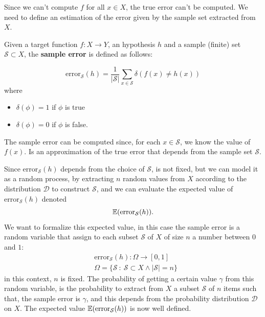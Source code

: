 \documentclass[10pt, letterpaper]{report}
\begin{document}
Since we can't compute $f$ for all $x\in X$, the true error can't be computed. We need to define an estimation of the error given by the sample set extracted from $X$.
\begin{definition}
	Given a target function $f:X\rightarrow Y$, an hypothesis $h$ and a sample (finite) set $\mathcal S\subset X$, the  \textbf{sample error} is defined as follows:
\end{definition}\begin{equation}
	\text{error}_{\mathcal S}(h)=
	\frac{1}{|\mathcal S|}\sum_{x\in\mathcal S}\delta(f(x)\ne h(x))
\end{equation}
where\begin{itemize}
	\item $\delta(\phi)=1$ if $\phi$ is true
	\item $\delta(\phi)=0$ if $\phi$ is false.
\end{itemize}
The sample error can be computed since, for each $x\in\mathcal S$, we know the value of $f(x)$. Is an approximation of the true error that depends from the sample set $\mathcal S$.\bigskip

Since $\text{error}_{\mathcal S}(h)$ depends from the choice of $\mathcal S$, is not fixed, but we can model it as a random process, by extracting $n$ random values from $X$ according to the distribution $\mathcal D$ to construct $\mathcal S$, and we can evaluate the expected value of $\text{error}_{\mathcal S}(h)$ denoted \begin{equation}
	{\mathbb E}(\text{error}_{\mathcal S}(h)).
\end{equation}
We want to formalize this expected value, in this case the sample error is a random variable that assign to each subset $\mathcal S$ of $X$ of size $n$ a number between 0 and $1$:
\begin{align}
	 & \text{error}_{\mathcal S}(h) : \Omega \rightarrow [0,1]                \\
	 & \Omega =\{\mathcal S \ : \ \mathcal S \subset X \land |\mathcal S|=n\}
\end{align}
in this context, $n$ is fixed. The probability of getting a certain value $\gamma$ from this random variable, is the probability to extract from $X$ a subset $\mathcal S$ of $n$ items such that, the sample error is $\gamma$, and this depends from the probability distribution $\mathcal D$ on $X$. The expected value ${\mathbb E}(\text{error}_{\mathcal S}(h))$ is now well defined.
\end{document}
